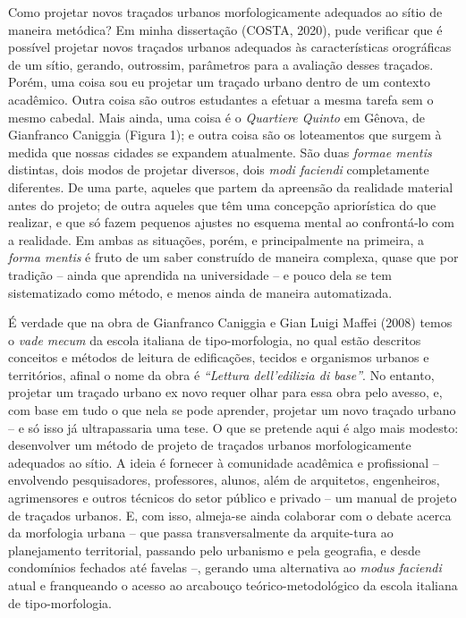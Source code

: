 \documentclass[twoside, 12pt, english,italian,latin,greek,french,spanish,brazil]{book}
\begin{document}
        Como projetar novos traçados urbanos morfologicamente adequados ao sítio de maneira metódica? Em minha dissertação (COSTA, 2020), pude verificar que é possível projetar novos traçados urbanos adequados às características orográficas de um sítio, gerando, outrossim, parâmetros para a avaliação desses traçados. Porém, uma coisa sou eu projetar um traçado urbano dentro de um contexto acadêmico. Outra coisa são outros estudantes a efetuar a mesma tarefa sem o mesmo cabedal. Mais ainda, uma coisa é o \textit{Quartiere Quinto} em Gênova, de Gianfranco Caniggia (Figura 1); e outra coisa são os loteamentos que surgem à medida que nossas cidades se expandem atualmente. São duas \textit{formae mentis} distintas, dois modos de projetar diversos, dois \textit{modi faciendi} completamente diferentes. De uma parte, aqueles que partem da apreensão da realidade material antes do projeto;  de outra aqueles que têm uma concepção apriorística do que realizar, e que só fazem pequenos ajustes no esquema mental ao confrontá-lo com a realidade. Em ambas as situações, porém, e principalmente na primeira, a \textit{forma mentis} é fruto de um saber construído de maneira complexa, quase que por tradição – ainda que aprendida na universidade – e pouco dela se tem sistematizado como método, e menos ainda de maneira automatizada. %

         É verdade que na obra de Gianfranco Caniggia e Gian Luigi Maffei (2008) temos o \textit{vade mecum} da escola italiana de tipo-morfologia, no qual estão descritos conceitos e métodos de leitura de edificações, tecidos e organismos urbanos e territórios, afinal o nome da obra é \textit{“Lettura dell’edilizia di base”}. No entanto, projetar um traçado urbano ex novo requer olhar para essa obra pelo avesso, e, com base em tudo o que nela se pode aprender, projetar um novo traçado urbano – e só isso já ultrapassaria uma tese. O que se pretende aqui é algo mais modesto: desenvolver um método de projeto de traçados urbanos morfologicamente adequados ao sítio. A ideia é fornecer à comunidade acadêmica e profissional – envolvendo pesquisadores, professores, alunos, além de arquitetos, engenheiros, agrimensores e outros técnicos do setor público e privado – um manual de projeto de traçados urbanos. E, com isso, almeja-se ainda colaborar com o debate acerca da morfologia urbana – que passa transversalmente da arquite-tura ao planejamento territorial, passando pelo urbanismo e pela geografia, e desde condomínios fechados até favelas –, gerando uma alternativa ao \textit{modus faciendi} atual e franqueando o acesso ao arcabouço teórico-metodológico da escola italiana de tipo-morfologia.
\end{document}
